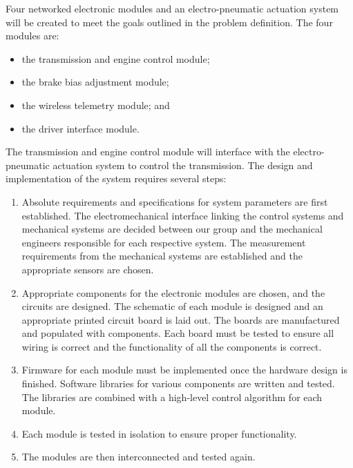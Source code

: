 Four networked electronic modules and an electro-pneumatic actuation system will be created to meet the goals outlined in the problem definition. The four modules are:

\begin{itemize}
\item the transmission and engine control module;
\item the brake bias adjustment module;
\item the wireless telemetry module; and
\item the driver interface module.
\end{itemize}

The transmission and engine control module will interface with the electro-pneumatic actuation system to control the transmission. The design and implementation of the system requires several steps:

\begin{enumerate}

\item Absolute requirements and specifications for system parameters are first established. The electromechanical interface linking the control systems and mechanical systems are decided between our group and the mechanical engineers responsible for each respective system. The measurement requirements from the mechanical systems are established and the appropriate sensors are chosen.

\item Appropriate components for the electronic modules are chosen, and the circuits are designed. The schematic of each module is designed and an appropriate printed circuit board is laid out. The boards are manufactured and populated with components. Each board must be tested to ensure all wiring is correct and the functionality of all the components is correct.

\item Firmware for each module must be implemented once the hardware design is finished. Software libraries for various components are written and tested. The libraries are combined with a high-level control algorithm for each module.
 
\item Each module is tested in isolation to ensure proper functionality. 

\item The modules are then interconnected and tested again.

\end{enumerate}


